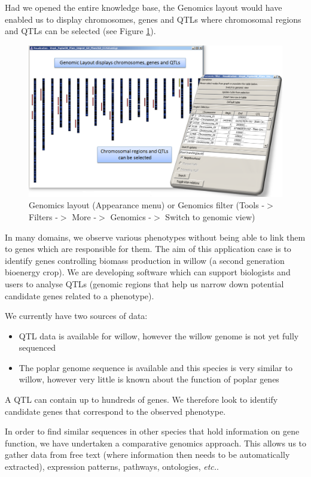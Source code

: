 Had we opened the entire knowledge base, the Genomics layout would have enabled us to display chromosomes, genes and QTLs 
where chromosomal regions and QTLs can be selected (see Figure \ref{fig:poplar_genomic_view}).
\begin{figure}[H]
\centering
\includegraphics[scale=0.3]{images/Oct12/poplar_genomic_view.png} 
\caption{Genomics layout (Appearance menu) or Genomics filter (Tools -$>$ Filters -$>$ More -$>$ Genomics -$>$ Switch to genomic view)}
\label{fig:poplar_genomic_view}
\end{figure}

In many domains, we observe various phenotypes without being able to link them to genes which are responsible for them.
The aim of this application case is to identify genes controlling biomass production in willow (a second generation bioenergy crop). 
We are developing software which can support biologists and users to analyse QTLs
(genomic regions that help us narrow down potential candidate genes related to a phenotype).

We currently have two sources of data:
\begin{itemize}
\item QTL data is available for willow, however the willow genome is not yet fully sequenced
\item The poplar genome sequence is available and this species is very similar to willow, however very little is known about the function of poplar genes
\end{itemize}
A QTL can contain up to hundreds of genes. We therefore look to identify candidate genes that correspond to the observed phenotype.

In order to find similar sequences in other species that hold information on gene function,
we have undertaken a comparative genomics approach.
This allows us to gather data from free text (where information then needs to be automatically extracted), 
expression patterns, pathways, ontologies, {\it{etc.}}.

